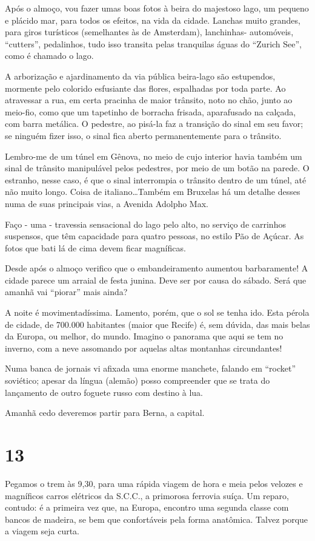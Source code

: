 Após o almoço, vou fazer umas boas fotos à beira do majestoso lago, um pequeno e plácido mar, para todos os efeitos, na vida da cidade. Lanchas muito grandes, para giros turísticos (semelhantes às de Amsterdam), lanchinhas- automóveis, “cutters”, pedalinhos, tudo isso transita pelas tranquilas águas do “Zurich See”, como é chamado o lago.

A arborização e ajardinamento da via pública beira-lago são estupendos, mormente pelo colorido esfusiante das flores, espalhadas por toda parte. Ao atravessar a rua, em certa pracinha de maior trânsito, noto no chão, junto ao meio-fio, como que um tapetinho de borracha frisada, aparafusado na calçada, com barra metálica. O pedestre, ao pisá-la faz a transição do sinal em seu favor; se ninguém fizer isso, o sinal fica aberto permanentemente para o trânsito.

Lembro-me de um túnel em Gênova, no meio de cujo interior havia também um sinal de trânsito manipulável pelos pedestres, por meio de um botão na parede. O estranho, nesse caso, é que o sinal interrompia o trânsito dentro de um túnel, até não muito longo. Coisa de italiano\ldots Também em Bruxelas há um detalhe desses numa de suas principais vias, a Avenida Adolpho Max.

Faço - uma - travessia sensacional do lago pelo alto, no serviço de carrinhos suspensos, que têm capacidade para quatro pessoas, no estilo Pão de Açúcar. As fotos que bati lá de cima devem ficar magníficas.

Desde após o almoço verifico que o embandeiramento aumentou barbaramente! A cidade parece um arraial de festa junina. Deve ser por causa do sábado. Será que amanhã vai “piorar” mais ainda?

A noite é movimentadíssima. Lamento, porém, que o sol se tenha ido. Esta pérola de cidade, de 700.000 habitantes (maior que Recife) é, sem dúvida, das mais belas da Europa, ou melhor, do mundo. Imagino o panorama que aqui se tem no inverno, com a neve assomando por aquelas altas montanhas circundantes!

Numa banca de jornais vi afixada uma enorme manchete, falando em “rocket” soviético; apesar da língua (alemão) posso compreender que se trata do lançamento de outro foguete russo com destino à lua.

Amanhã cedo deveremos partir para Berna, a capital.

\section*{13 \adfflatleafright {}}
Pegamos o trem às 9,30, para uma rápida viagem de hora e meia pelos velozes e magníficos carros elétricos da S.C.C., a primorosa ferrovia suíça. Um reparo, contudo: é a primeira vez que, na Europa, encontro uma segunda classe com bancos de madeira, se bem que confortáveis pela forma anatômica. Talvez porque a viagem seja curta.

